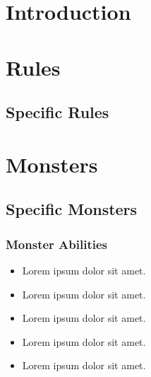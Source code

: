 \documentclass{zine}
\author{\textit{Written by YOURNAME}}
\begin{document}
\maketitle

\begin{abstract}
\hrule \vspace{2mm}
\begin{center}
    \lipsum[10]
\end{center}
\vspace{2mm} \hrule
\end{abstract}

\section{Introduction}
    \lipsum[2]

%
\begin{multicols*}{2}

\section{Rules}
    \lipsum[4]

\subsection*{Specific Rules}
    \lipsum[5]

\section{Monsters}
    \lipsum[6-8]

\subsection*{Specific Monsters}
\colbox{
    \lipsum[7]
}

\subsubsection*{Monster Abilities}

%
\begin{itemize}
    \item Lorem ipsum dolor sit amet.
    \item[\ding{51}] Lorem ipsum dolor sit amet.
    \item[\ding{61}] Lorem ipsum dolor sit amet.
    \item[\ding{86}] Lorem ipsum dolor sit amet.
    \item[\ding{108}] Lorem ipsum dolor sit amet.
\end{itemize}

\end{multicols*}
\end{document}
